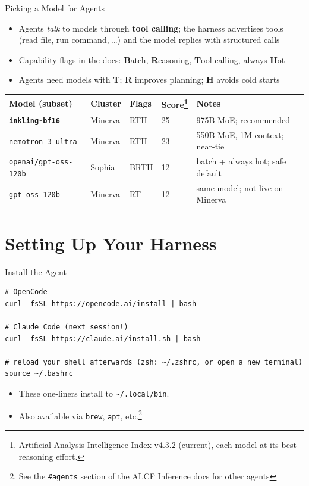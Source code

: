 \documentclass[10pt,aspectratio=169]{beamer}
\begin{document}
\begin{frame}{Picking a Model for Agents}
  \begin{itemize}
    \item Agents \emph{talk} to models through \textbf{tool calling}; the
      harness advertises tools (read file, run command, \dots) and the model
      replies with structured calls
      \pause
    \item Capability flags in the docs: \textbf{B}atch, \textbf{R}easoning,
      \textbf{T}ool calling, always \textbf{H}ot
      \pause
    \item Agents need models with \textbf{T}; \textbf{R} improves planning;
      \textbf{H} avoids cold starts
      \pause
  \end{itemize}
  \vspace{0.5em}
  \setcounter{footnote}{0}
  \begin{table}
    \centering\footnotesize
    \begin{tabular}{@{}llll>{\raggedright\arraybackslash}p{4.6cm}@{}}
      \toprule
      Model (subset) & Cluster & Flags & Score\footnote{Artificial Analysis
        Intelligence Index v4.3.2 (current), each model at its best
        reasoning effort.} & Notes \\
      \midrule
      \textbf{\texttt{inkling-bf16}} & Minerva & RTH & 25 & 975B MoE; recommended \\
      \texttt{nemotron-3-ultra} & Minerva & RTH & 23 & 550B MoE, 1M context; near-tie \\
      \texttt{openai/gpt-oss-120b} & Sophia & BRTH & 12 & batch + always hot; safe default \\
      \texttt{gpt-oss-120b} & Minerva & RT & 12 & same model; not live on Minerva \\
      \bottomrule
    \end{tabular}
  \end{table}
\end{frame}

\section{Setting Up Your Harness}

\begin{frame}[fragile]{Install the Agent}
  \begin{verbatim}
# OpenCode
curl -fsSL https://opencode.ai/install | bash

# Claude Code (next session!)
curl -fsSL https://claude.ai/install.sh | bash

# reload your shell afterwards (zsh: ~/.zshrc, or open a new terminal)
source ~/.bashrc
  \end{verbatim}
  \pause
  \begin{itemize}
    \item These one-liners install to \texttt{\textasciitilde/.local/bin}.
      \pause
    \item Also available via \texttt{brew}, \texttt{apt}, etc.\footnote{See the
      \texttt{\#agents} section of the ALCF Inference docs for other agents}
  \end{itemize}
\end{frame}
\end{document}
